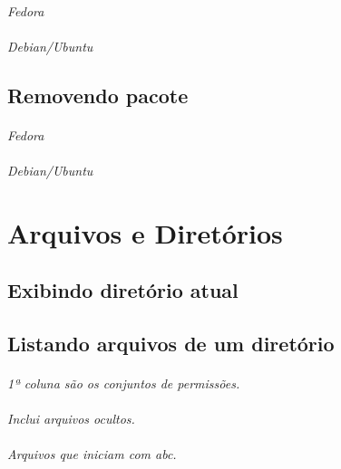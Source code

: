 \documentclass[a4paper,9pt]{extarticle}
\begin{document}
\begin{multicols}{2}
	\paragraph{} \emph{Fedora}
	
	\paragraph{} \emph{Debian/Ubuntu}
	
\subsection{Removendo pacote}
	\paragraph{} \emph{Fedora}
	
	\paragraph{} \emph{Debian/Ubuntu}
\section{Arquivos e Diretórios}
\subsection{Exibindo diretório atual}

	
\subsection{Listando arquivos de um diretório}
	
	\paragraph{} \emph{1ª coluna são os conjuntos de permissões.}
	\paragraph{} \emph{Inclui arquivos ocultos.}
	\paragraph{} \emph{Arquivos que iniciam com abc.}

\end{multicols}
\end{document}
